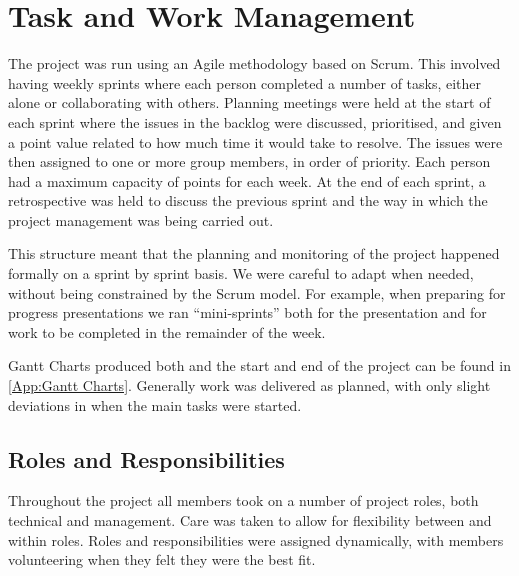 \section{Task and Work Management}
\label{Section:Task and Work Management}

The project was run using an Agile methodology based on Scrum. This involved having weekly sprints where each person completed a number of tasks, either alone or collaborating with others. Planning meetings were held at the start of each sprint where the issues in the backlog were discussed, prioritised, and given a point value related to how much time it would take to resolve. The issues were then assigned to one or more group members, in order of priority. Each person had a maximum capacity of points for each week. At the end of each sprint, a retrospective was held to discuss the previous sprint and the way in which the project management was being carried out.

This structure meant that the planning and monitoring of the project happened formally on a sprint by sprint basis. We were careful to adapt when needed, without being constrained by the Scrum model. For example, when preparing for progress presentations we ran ``mini-sprints'' both for the presentation and for work to be completed in the remainder of the week.

Gantt Charts produced both and the start and end of the project can be found in \cref{App:Gantt Charts}. Generally work was delivered as planned, with only slight deviations in when the main tasks were started. 

\subsection{Roles and Responsibilities}

Throughout the project all members took on a number of project roles, both technical and management. Care was taken to allow for flexibility between and within roles. Roles and responsibilities were assigned dynamically, with members volunteering when they felt they were the best fit.

